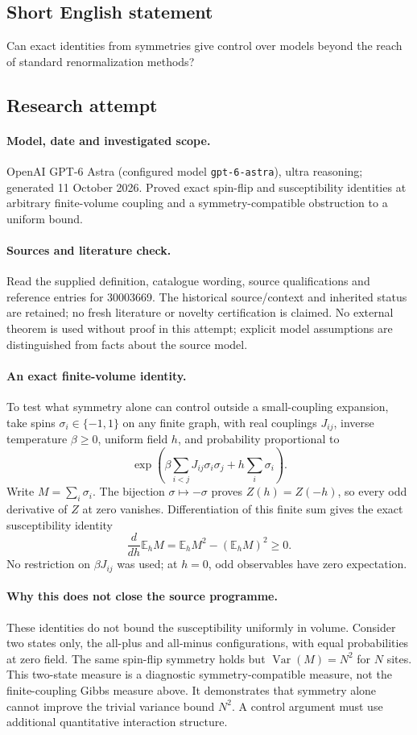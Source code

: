 \documentclass[11pt]{article}
\begin{document}
\subsection{Short English statement}
Can exact identities from symmetries give control over models beyond the reach of standard renormalization methods?
\subsection{Research attempt}
\paragraph{Model, date and investigated scope.}
OpenAI GPT-6 Astra (configured model \texttt{gpt-6-astra}), ultra reasoning; generated 11 October 2026. Proved exact spin-flip and susceptibility identities at arbitrary finite-volume coupling and a symmetry-compatible obstruction to a uniform bound.

\paragraph{Sources and literature check.}
Read the supplied definition, catalogue wording, source qualifications and reference entries for 30003669. The historical source/context and inherited status are retained; no fresh literature or novelty certification is claimed. No external theorem is used without proof in this attempt; explicit model assumptions are distinguished from facts about the source model.

\paragraph{An exact finite-volume identity.} To test what symmetry alone can control outside a small-coupling expansion, take spins \(\sigma_i\in\{-1,1\}\) on any finite graph, with real couplings \(J_{ij}\), inverse temperature \(\beta\ge0\), uniform field \(h\), and probability proportional to
\[
 \exp\left(\beta\sum_{i<j}J_{ij}\sigma_i\sigma_j+h\sum_i\sigma_i\right).
\]
Write \(M=\sum_i\sigma_i\). The bijection \(\sigma\mapsto-\sigma\) proves \(Z(h)=Z(-h)\), so every odd derivative of \(Z\) at zero vanishes. Differentiation of this finite sum gives the exact susceptibility identity
\[
 \frac{d}{dh}\mathbb E_h M=\mathbb E_h M^2-(\mathbb E_h M)^2\ge0.
\]
No restriction on \(\beta J_{ij}\) was used; at \(h=0\), odd observables have zero expectation.
\paragraph{Why this does not close the source programme.} These identities do not bound the susceptibility uniformly in volume. Consider two states only, the all-plus and all-minus configurations, with equal probabilities at zero field. The same spin-flip symmetry holds but \(\operatorname{Var}(M)=N^2\) for \(N\) sites. This two-state measure is a diagnostic symmetry-compatible measure, not the finite-coupling Gibbs measure above. It demonstrates that symmetry alone cannot improve the trivial variance bound \(N^2\). A control argument must use additional quantitative interaction structure.
\end{document}
